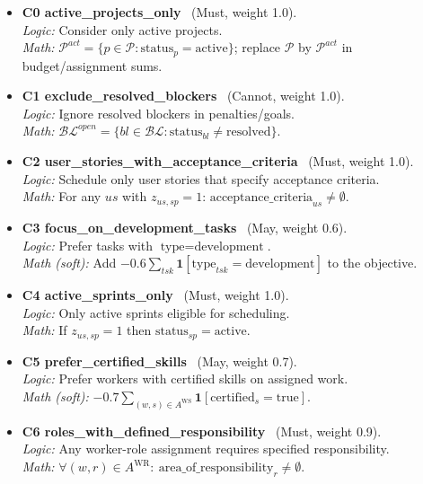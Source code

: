 \documentclass[11pt,a4paper]{article}
\begin{document}
\begin{itemize}[leftmargin=2em]
  \item \textbf{C0 active\_projects\_only} \ (Must, weight 1.0). \\
  \emph{Logic:} Consider only active projects. \\
  \emph{Math:} \(\mathcal{P}^{act}=\{p\in\mathcal{P}:\text{status}_{p}=\text{active}\}\); replace \(\mathcal{P}\) by \(\mathcal{P}^{act}\) in budget/assignment sums.

  \item \textbf{C1 exclude\_resolved\_blockers} \ (Cannot, weight 1.0). \\
  \emph{Logic:} Ignore resolved blockers in penalties/goals. \\
  \emph{Math:} \(\mathcal{BL}^{open}=\{bl\in\mathcal{BL}:\text{status}_{bl}\neq\text{resolved}\}\).

  \item \textbf{C2 user\_stories\_with\_acceptance\_criteria} \ (Must, weight 1.0). \\
  \emph{Logic:} Schedule only user stories that specify acceptance criteria. \\
  \emph{Math:} For any \(us\) with \(z_{us,sp}=1\): \(\text{acceptance\_criteria}_{us}\neq\emptyset\).

  \item \textbf{C3 focus\_on\_development\_tasks} \ (May, weight 0.6). \\
  \emph{Logic:} Prefer tasks with \(\text{type}=\text{development}\). \\
  \emph{Math (soft):} Add \(-0.6\sum_{tsk}\mathbf{1}[\text{type}_{tsk}=\text{development}]\) to the objective.

  \item \textbf{C4 active\_sprints\_only} \ (Must, weight 1.0). \\
  \emph{Logic:} Only active sprints eligible for scheduling. \\
  \emph{Math:} If \(z_{us,sp}=1\) then \(\text{status}_{sp}=\text{active}\).

  \item \textbf{C5 prefer\_certified\_skills} \ (May, weight 0.7). \\
  \emph{Logic:} Prefer workers with certified skills on assigned work. \\
  \emph{Math (soft):} \(-0.7\sum_{(w,s)\in A^{\mathrm{WS}}}\mathbf{1}[\text{certified}_{s}=\text{true}]\).

  \item \textbf{C6 roles\_with\_defined\_responsibility} \ (Must, weight 0.9). \\
  \emph{Logic:} Any worker-role assignment requires specified responsibility. \\
  \emph{Math:} \(\forall (w,r)\in A^{\mathrm{WR}}:\ \text{area\_of\_responsibility}_{r}\neq\emptyset\).


\end{itemize}
\end{document}

